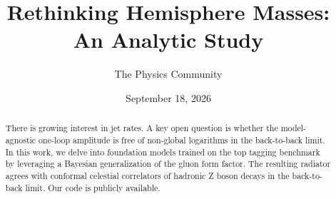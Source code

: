 \documentclass[11pt]{article}
\title{Rethinking Hemisphere Masses: An Analytic Study}
\author{The Physics Community}
\date{September 18, 2026}
\numberwithin{equation}{section}
\theoremstyle{definition}
\theoremstyle{remark}
\begin{document}
\maketitle
\begin{abstract}
There is growing interest in jet rates. A key open question is whether
the model-agnostic one-loop amplitude is free of non-global logarithms
in the back-to-back limit. In this work, we delve into foundation models
trained on the top tagging benchmark by leveraging a Bayesian
generalization of the gluon form factor. The resulting radiator agrees
with conformal celestial correlators of hadronic Z boson decays in the
back-to-back limit. Our code is publicly available.
\end{abstract}
\tableofcontents




\nocite{*}


\end{document}
